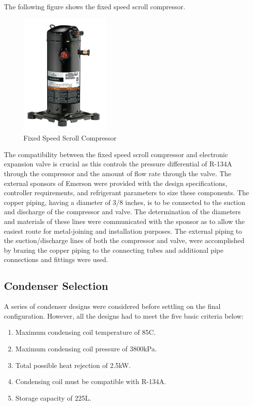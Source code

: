 \medskip
The following figure shows the fixed speed scroll compressor.

\medskip
\begin{figure}[H]
    \centering
    \includegraphics[width=4.5cm]{images/fixed_speed_compressor.png}
    \caption{Fixed Speed Scroll Compressor}
\end{figure}

\medskip
The compatibility between the fixed speed scroll compressor and electronic expansion valve is crucial as this controls the pressure differential of R-134A through the compressor and the amount of flow rate through the valve. The external sponsors of Emerson were provided with the design specifications, controller requirements, and refrigerant parameters to size these components. The copper piping, having a diameter of 3/8 inches, is to be connected to the suction and discharge of the compressor and valve. The determination of the diameters and materials of these lines were communicated with the sponsor as to allow the easiest route for metal-joining and installation purposes. The external piping to the suction/discharge lines of both the compressor and valve, were accomplished by brazing the copper piping to the connecting tubes and additional pipe connections and fittings were used. 

\subsection{Condenser Selection}

A series of condenser designs were considered before settling on the final configuration. However, all the designs had to meet the five basic criteria below:

\medskip
\begin{enumerate}[itemsep=3mm, parsep=-1mm, label=\roman*.]
    \item Maximum condensing coil temperature of 85\textdegree C.
    \item Maximum condensing coil pressure of 3800kPa.
    \item Total possible heat rejection of 2.5kW.
    \item Condensing coil must be compatible with R-134A.
    \item Storage capacity of 225L.
\end{enumerate}

